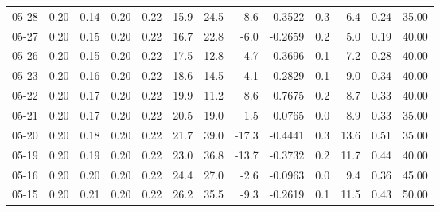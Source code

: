 \begin{threeparttable}
{\begin{tabular}{lrrrrrrrrrrrr}
  05-28 &          0.20 &          0.14 &          0.20 &        0.22 &                15.9 &                24.5 &       -8.6 &      -0.3522 &                 0.3 &              6.4 &            0.24 &                  35.00 \\
  05-27 &          0.20 &          0.15 &          0.20 &        0.22 &                16.7 &                22.8 &       -6.0 &      -0.2659 &                 0.2 &              5.0 &            0.19 &                  40.00 \\
  05-26 &          0.20 &          0.15 &          0.20 &        0.22 &                17.5 &                12.8 &        4.7 &       0.3696 &                 0.1 &              7.2 &            0.28 &                  40.00 \\
  05-23 &          0.20 &          0.16 &          0.20 &        0.22 &                18.6 &                14.5 &        4.1 &       0.2829 &                 0.1 &              9.0 &            0.34 &                  40.00 \\
  05-22 &          0.20 &          0.17 &          0.20 &        0.22 &                19.9 &                11.2 &        8.6 &       0.7675 &                 0.2 &              8.7 &            0.33 &                  40.00 \\
  05-21 &          0.20 &          0.17 &          0.20 &        0.22 &                20.5 &                19.0 &        1.5 &       0.0765 &                 0.0 &              8.9 &            0.33 &                  35.00 \\
  05-20 &          0.20 &          0.18 &          0.20 &        0.22 &                21.7 &                39.0 &      -17.3 &      -0.4441 &                 0.3 &             13.6 &            0.51 &                  35.00 \\
  05-19 &          0.20 &          0.19 &          0.20 &        0.22 &                23.0 &                36.8 &      -13.7 &      -0.3732 &                 0.2 &             11.7 &            0.44 &                  40.00 \\
  05-16 &          0.20 &          0.20 &          0.20 &        0.22 &                24.4 &                27.0 &       -2.6 &      -0.0963 &                 0.0 &              9.4 &            0.36 &                  45.00 \\
  05-15 &          0.20 &          0.21 &          0.20 &        0.22 &                26.2 &                35.5 &       -9.3 &      -0.2619 &                 0.1 &             11.5 &            0.43 &                  50.00 \\

\end{tabular}}
\end{threeparttable}
